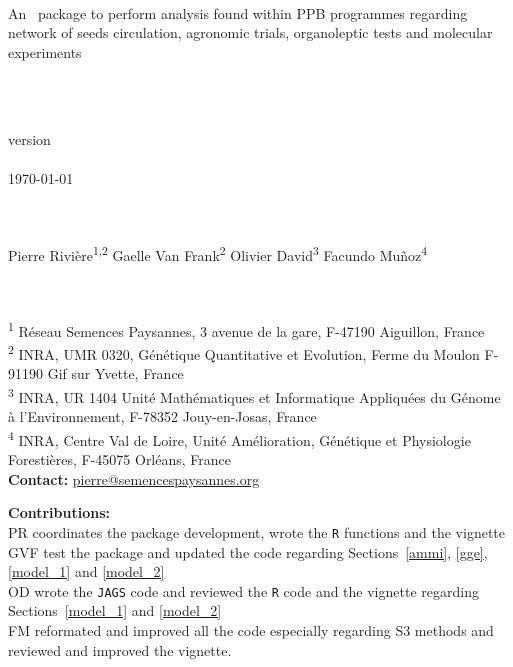 \pagestyle{empty}
\begin{center}
\Huge{\pack } \\
\Large{An \R~package to perform analysis found within PPB programmes regarding network of seeds circulation, agronomic trials, organoleptic tests and molecular experiments}

~\\


~\\

version \versionnumber \\

~\\
\today

~\\~\\

Pierre Rivi\`ere\textsuperscript{1,2} \hspace{.5cm} 
Gaelle Van Frank\textsuperscript{2} \hspace{.5cm}
Olivier David\textsuperscript{3}  \hspace{.5cm} 
Facundo Muñoz\textsuperscript{4}
\\
~\\~\\ 
\end{center}

\vfill

\noindent\textsuperscript{1} R\'eseau Semences Paysannes, 3 avenue de la gare, F-47190 Aiguillon, France \\
\textsuperscript{2} INRA, UMR 0320, Génétique Quantitative et Evolution, Ferme du Moulon F-91190 Gif sur Yvette, France \\
\textsuperscript{3} INRA, UR 1404 Unité Mathématiques et Informatique Appliquées du Génome à l'Environnement, F-78352 Jouy-en-Josas, France \\ 
\textsuperscript{4} INRA, Centre Val de Loire, Unité Amélioration, Génétique et Physiologie Forestières, F-45075 Orléans, France \\ 
\textbf{Contact:} \href{mailto:pierre@semencespaysannes.org}{pierre@semencespaysannes.org} \\

\vfill

\noindent\textbf{Contributions:} \\
PR coordinates the package development, wrote the \texttt{R} functions and the vignette \\
GVF test the package and updated the code regarding Sections~\ref{ammi}, \ref{gge}, \ref{model_1} and \ref{model_2} \\
OD wrote the \texttt{JAGS} code and reviewed the \texttt{R} code and the vignette regarding Sections~\ref{model_1} and \ref{model_2} \\
FM reformated and improved all the code especially regarding S3 methods and reviewed and improved the vignette. \\

